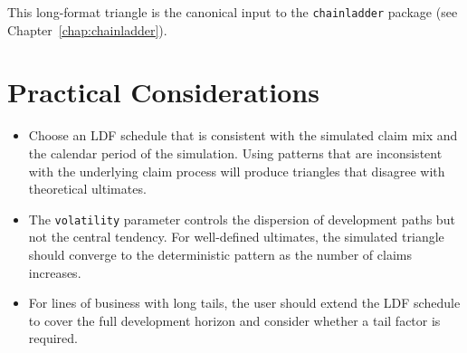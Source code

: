 This long-format triangle is the canonical input to the
\texttt{chainladder} package (see Chapter~\ref{chap:chainladder}).

\section{Practical Considerations}

\begin{itemize}[leftmargin=*]
    \item Choose an LDF schedule that is consistent with the simulated
          claim mix and the calendar period of the simulation. Using
          patterns that are inconsistent with the underlying claim
          process will produce triangles that disagree with theoretical
          ultimates.
    \item The \texttt{volatility} parameter controls the dispersion of
          development paths but not the central tendency. For
          well-defined ultimates, the simulated triangle should
          converge to the deterministic pattern as the number of claims
          increases.
    \item For lines of business with long tails, the user should
          extend the LDF schedule to cover the full development horizon
          and consider whether a tail factor is required.
\end{itemize}
